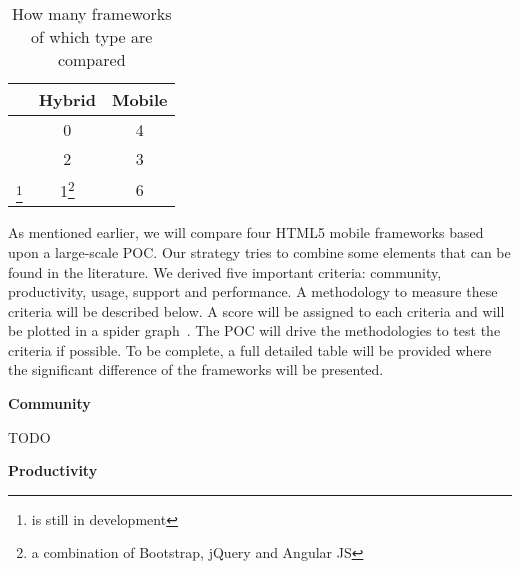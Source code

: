 \documentclass[a4paper]{artikel3}
\renewcommand{\paragraph}[1]{{\bf #1} }
\begin{document}

\begin{table}[h!]
\centering
\begin{tabular}{lcc}
  & \textbf{Hybrid} & \textbf{Mobile}\\
  \hline \hline
\cite{Sarrafi2012a} & 0 & 4\\
\cite{Rozynski2011} & 2 & 3\\
\cite{Ayuso2012}\footnote{is still in development} & 1\footnote{a combination of Bootstrap, jQuery and Angular JS} & 6 \\
\end{tabular}
\caption{How many frameworks of which type are compared}
\label{table:references_frameworks}
\end{table}

As mentioned earlier,  we will compare four HTML5 mobile frameworks based upon a large-scale POC.  Our strategy tries to combine some elements that can be found in the literature.  We derived five important criteria:  community,  productivity,  usage,  support and performance.  A methodology to measure these criteria will be described below.  A score will be assigned to each criteria and will be plotted in a spider graph~\cite{Few2005}.   The POC will drive the methodologies to test the criteria if possible.  To be complete,  a full detailed table will be provided where the significant difference of the frameworks will be presented. 	


\paragraph{Community}%

TODO 

\paragraph{Productivity}%
\end{document}
